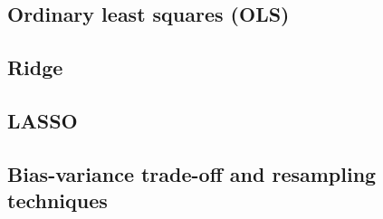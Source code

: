 \thispagestyle{plain}

\subsection{Ordinary least squares (OLS)}
\subsection{Ridge}
\subsection{LASSO}
\subsection{Bias-variance trade-off and resampling techniques}
